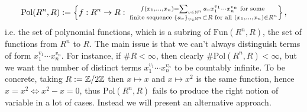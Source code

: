 $$\text{Pol}(R^n,R):= \left\{ f : R^n\rightarrow R : \substack{f(x_1,\dots,x_n) = \sum_{v\in \mathbb{N}^n} a_vx_1^{v_1}\cdots x_n^{v_n} \text{ for some}\\ \text{ finite sequence } \{a_v\}_{v\in\mathbb{N}^n}\subset R  \text{ for all } (x_1,\dots,x_n)\in R^n} \right\},$$
i.e. the set of polynomial functions, which is a subring of $\text{Fun}(R^n,R)$, the set of functions from $R^n$ to $R$. The main issue is that we can't always distinguish terms of form $x_1^{v_1}\cdots x_n^{v_n}$. For instance, if $\#R < \infty$, then clearly $\#\text{Pol}(R^n,R) < \infty$, but we want the number of distinct terms $x_1^{v_1}\cdots x_n^{v_n}$ to be countably infinite. To be concrete, taking $R := \mathbb{Z}/2\mathbb{Z}$ then $x\mapsto x$ and $x\mapsto x^2$ is the same function, hence $x = x^2 \iff x^2-x = 0$, thus $\text{Pol}(R^n,R)$ fails to produce the right notion of variable in a lot of cases. Instead we will present an alternative approach.  
